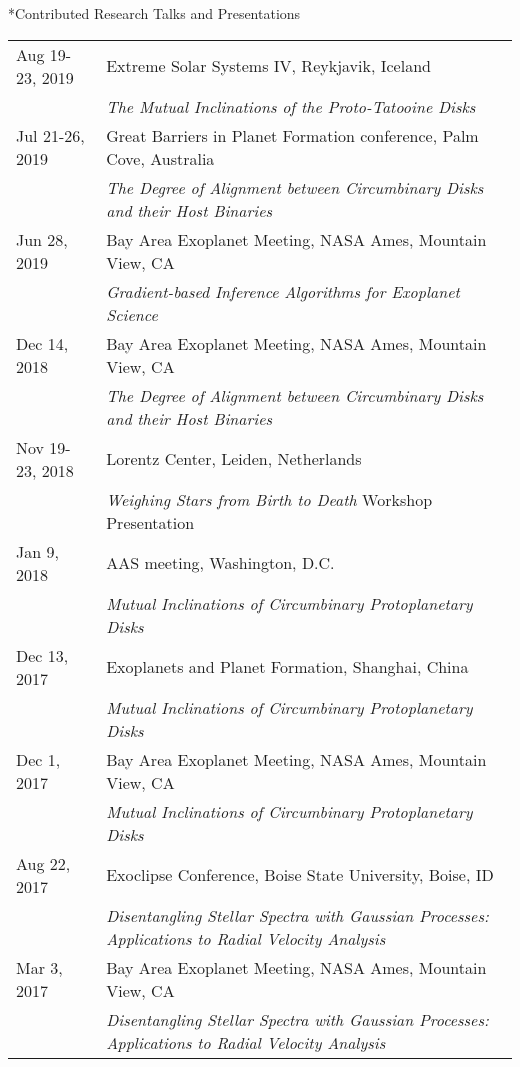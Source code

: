 \documentclass[10pt]{article}
\makeatletter
\newcommand{\rowskip}{1.2mm}
\renewcommand{\section}{\@startsection{section}{1}{0pt}{-\baselineskip}{0.5\baselineskip}{\scshape\color{myblue1}}}
\makeatother
\begin{document}
\section*{Contributed Research Talks and Presentations}
\begin{tabular*}{\textwidth}{@{\hspace{10pt}}p{1.2in}l}
  Aug 19-23, 2019 & Extreme Solar Systems IV, Reykjavik, Iceland\\ 
  & \emph{The Mutual Inclinations of the Proto-Tatooine Disks} \\[\rowskip]
  Jul 21-26, 2019 & Great Barriers in Planet Formation conference, Palm Cove, Australia\\
  & \emph{The Degree of Alignment between Circumbinary Disks and their Host Binaries} \\[\rowskip]
  Jun 28, 2019 & Bay Area Exoplanet Meeting, NASA Ames, Mountain View, CA\\
  & \emph{Gradient-based Inference Algorithms for Exoplanet Science} \\[\rowskip]
  Dec 14, 2018 & Bay Area Exoplanet Meeting, NASA Ames, Mountain View, CA\\
  & \emph{The Degree of Alignment between Circumbinary Disks and their Host Binaries} \\[\rowskip]
  Nov 19-23, 2018 & Lorentz Center, Leiden, Netherlands\\
  & \emph{Weighing Stars from Birth to Death} Workshop Presentation \\[\rowskip]
  Jan 9, 2018 & AAS meeting, Washington, D.C. \\
  & \emph{Mutual Inclinations of Circumbinary Protoplanetary Disks} \\[\rowskip]
  Dec 13, 2017 & Exoplanets and Planet Formation, Shanghai, China \\
  & \emph{Mutual Inclinations of Circumbinary Protoplanetary Disks} \\[\rowskip]
  Dec 1, 2017 & Bay Area Exoplanet Meeting, NASA Ames, Mountain View, CA\\
  & \emph{Mutual Inclinations of Circumbinary Protoplanetary Disks} \\[\rowskip]
  Aug 22, 2017 & Exoclipse Conference, Boise State University, Boise, ID\\
  & \emph{Disentangling Stellar Spectra with Gaussian Processes: Applications to Radial Velocity Analysis} \\[\rowskip]
  Mar 3, 2017 & Bay Area Exoplanet Meeting, NASA Ames, Mountain View, CA\\
  & \emph{Disentangling Stellar Spectra with Gaussian Processes: Applications to Radial Velocity Analysis} \\[\rowskip]
\end{tabular*}
\end{document}
